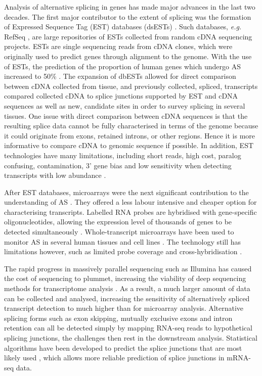 \documentclass[12pt]{article}
\begin{document}
				
			Analysis of alternative splicing in genes has made major advances in the last two decades.
			The first major contributor to the extent of splicing was the formation of Expressed Sequence Tag (EST) databases (dsESTs) \citep{Parkinson09}.
			Such databases, \textit{e.g.} RefSeq \citep{Pruitt14}, are large repositories of ESTs collected from random cDNA sequencing projects. 
			ESTs are single sequencing reads from cDNA clones, which were originally used to predict genes through alignment to the genome.
			With the use of ESTs, the prediction of the proportion of human genes which undergo AS increased to 50\% \citep{Kan01,Brett02}.
			The expansion of dbESTs allowed for direct comparison between cDNA collected from tissue, and previously collected, spliced, transcripts \citet{Pan08} compared collected cDNA to splice junctions supported by EST and cDNA sequences as well as new, candidate sites in order to survey splicing in several tissues.
			One issue with direct comparison between cDNA sequences is that the resulting splice data cannot be fully characterised in terms of the genome because it could originate from exons, retained introns, or other regions. 
			Hence it is more informative to compare cDNA to genomic sequence if possible. 
			In addition, EST technologies have many limitations, including short reads, high cost, paralog confusing, contamination, 3' gene bias and low sensitivity when detecting transcripts with low abundance \citep{Lewis03, Florea06, Wang10}.
			
			After EST databases, microarrays were the next significant contribution to the understanding of AS \citep{Johnson03}.
			They offered a less labour intensive and cheaper option for characterising transcripts.
			Labelled RNA probes are hybridised with gene-specific oligonucleotides, allowing the expression level of thousands of genes to be detected simultaneously \citep{Hu01, Wang03}. 
			Whole-transcript microarrays have been used to monitor AS in several human tissues and cell lines \citep{Castle08}.
			The technology still has limitations however, such as limited probe coverage and cross-hybridisation \citep{Wang10}. 
			
			The rapid progress in massively parallel sequencing such as Illumina has caused the cost of sequencing to plummet, increasing the viability of deep sequencing methods for transcriptome analysis \citep{Blencowe09}.
			As a result, a much larger amount of data can be collected and analysed, increasing the sensitivity of alternatively spliced transcript detection to much higher than for microarray analysis.
			Alternative splicing forms such as exon skipping, mutually exclusive exons and intron retention can all be detected simply by mapping RNA-seq reads to hypothetical splicing junctions, the challenges then rest in the downstream analysis.
			Statistical algorithms have been developed to predict the splice junctions that are most likely used \citep{Wang10}, which allows more reliable prediction of splice junctions in mRNA-seq data. 
			
\end{document}
